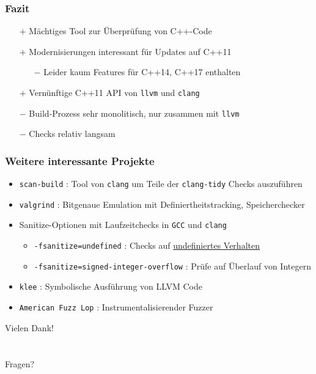 \documentclass[aspectratio=169]{beamer}
\begin{document}
\begin{frame}
  \frametitle{Fazit}
  \begin{itemize}
    \item[$+$] Mächtiges Tool zur Überprüfung von C++-Code
    \item[$+$] Modernisierungen interessant für Updates auf C++11 
      \begin{itemize}
      \item[$-$] Leider kaum Features für C++14, C++17 enthalten
      \end{itemize}
    \item[$+$] Vernünftige C++11 API von \texttt{llvm} und \texttt{clang}  
    \item[$-$] Build-Prozess sehr monolitisch, nur zusammen mit \texttt{llvm}
    \item[$-$] Checks relativ langsam
  \end{itemize}
\end{frame}

\begin{frame}
  \frametitle{Weitere interessante Projekte}
  \begin{itemize}
    \item \texttt{scan-build} : Tool von \texttt{clang} um Teile der \texttt{clang-tidy} Checks auszuführen
    \item \texttt{valgrind} : Bitgenaue Emulation mit Definiertheitstracking, Speicherchecker
    \item Sanitize-Optionen mit Laufzeitchecks in \texttt{GCC} und \texttt{clang}
      \begin{itemize}
      \item \texttt{-fsanitize=undefined} : Checks auf \href{https://blog.regehr.org/archives/213}{undefiniertes Verhalten}
      \item \texttt{-fsanitize=signed-integer-overflow} : Prüfe auf Überlauf von Integern
      \end{itemize}
    \item \texttt{klee} : Symbolische Ausführung von LLVM Code
    \item \texttt{American Fuzz Lop} : Instrumentalisierender Fuzzer 
    \end{itemize}
\end{frame}

\begin{frame}
  \begin{center}
    \Huge{Vielen Dank!}\\
    ~\\
    ~\\
    \Large{Fragen?}
  \end{center}
\end{frame}
\end{document}
